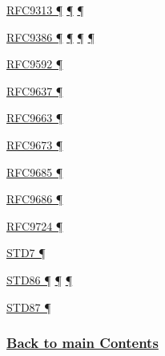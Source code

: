\documentclass[
]{article}
\begin{document}
\hyperref[coexistence-with-legacy-ipv4]{RFC9313 ¶}
\hyperref[dual-stack-scenarios]{¶}
\hyperref[translation-and-ipv4-as-a-service]{¶}

\hyperref[dual-stack-scenarios]{RFC9386 ¶}
\hyperref[deployment-by-carriers]{¶}
\hyperref[deployment-in-the-enterprise]{¶} \hyperref[status]{¶}

\hyperref[addresses]{RFC9592 ¶}

\hyperref[addresses]{RFC9637 ¶}

\hyperref[prefix-per-host]{RFC9663 ¶}

\hyperref[extension-headers-and-options]{RFC9673 ¶}

\hyperref[address-resolution]{RFC9685 ¶}

\hyperref[address-and-prefix-management]{RFC9686 ¶}

\hyperref[address-and-prefix-management]{RFC9724 ¶}

\hyperref[transport-protocols]{STD7 ¶}

\hyperref[ipv6-basic-technology]{STD86 ¶}
\hyperref[extension-headers-and-options]{¶} \hyperref[markdown-usage]{¶}

\hyperref[extension-headers-and-options]{STD87 ¶}

\subsubsection{\texorpdfstring{\hyperref[list-of-contents]{Back to main
Contents}}{Back to main Contents}}\label{back-to-main-contents-13}

\pagebreak
\end{document}
